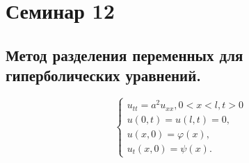 \documentclass[11pt]{article}
\def\zall{\setcounter{lem}{0}\setcounter{cnsqnc}{0}\setcounter{th}{0}\setcounter{Cmt}{0}\setcounter{equation}{0}}
\newcounter{lem}\setcounter{lem}{0}
\newcounter{th}\setcounter{th}{0}
\newcounter{cnsqnc}\setcounter{cnsqnc}{0}
\newcounter{Cmt}\setcounter{Cmt}{0}
\begin{document}
\section{Семинар 12}
\label{sec:org0683274}
\zall
\subsection{Метод разделения переменных для гиперболических уравнений.}
\label{sec:orgf7c03b3}
\begin{equation}
\begin{cases}
u_{tt} = a^2u_{xx}, 0 < x < l, t > 0\\
u(0, t) = u(l, t) = 0, \\
u(x, 0) = \varphi(x), \\
u_t(x, 0) = \psi(x).
\end{cases}
\end{equation}
\end{document}
